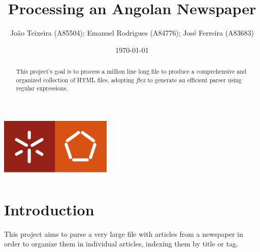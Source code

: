 \documentclass[a4paper]{report}
\begin{document}
\title{Processing an Angolan Newspaper}
\author{João Teixeira (A85504); Emanuel Rodrigues (A84776); José Ferreira (A83683)}
\date{\today}

\begin{center}
    \begin{minipage}{0.75\linewidth}
        \centering
        \includegraphics[width=0.4\textwidth]{eng.jpeg}\par\vspace{1cm}
        \vspace{1.5cm}
        \href{https://www.uminho.pt/PT}
        {\color{black}{\scshape\LARGE Universidade do Minho}} \par
        \vspace{1cm}
        \href{https://www.di.uminho.pt/}
        {\color{black}{\scshape\Large Departamento de Informática}} \par
        \vspace{1.5cm}
        \maketitle
    \end{minipage}
\end{center}

\begin{abstract}
    \begin{center}
        This project's goal is to process a million line long file to produce a
        comprehensive and organized collection of HTML files, adopting
        \textit{flex} to generate an efficient parser using regular expressions.
    \end{center}
\end{abstract}

\tableofcontents

\pagebreak

\chapter{Introduction}
This project aims to parse a very large file with articles from a newspaper in
order to organize them in individual articles, indexing them by title or tag.
\end{document}
